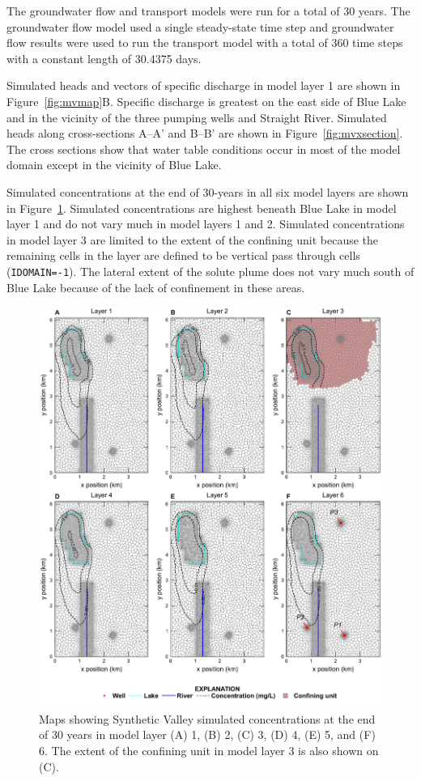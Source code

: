 \documentclass[12pt, oneside]{article}  	%
\begin{document}
The groundwater flow and transport models were run for a total of 30 years. The groundwater flow model used a single steady-state time step and groundwater flow results were used to run the transport model with a total of 360 time steps with a constant length of 30.4375 days.
 
Simulated heads and vectors of specific discharge in model layer 1 are shown in Figure~\ref{fig:mvmap}B. Specific discharge is greatest on the east side of Blue Lake and in the vicinity of the three pumping wells and Straight River. Simulated heads along cross-sections A--A' and B--B' are shown in Figure~\ref{fig:mvxsection}. The cross sections show that water table conditions occur in most of the model domain except in the vicinity of Blue Lake.

Simulated concentrations at the end of 30-years in all six model layers are shown in Figure~\ref{fig:mvconc}. Simulated concentrations are highest beneath Blue Lake in model layer 1 and do not vary much in model layers 1 and 2. Simulated concentrations in model layer 3 are limited to the extent of the confining unit because the remaining cells in the layer are defined to be vertical pass through cells (\texttt{IDOMAIN=-1}). The lateral extent of the solute plume does not vary much south of Blue Lake because of the lack of confinement in these areas.

\begin{figure}[ht!]
	\begin{center}
		\includegraphics{figures/mv_voronoi_map_concentration.pdf}
	\end{center}
	\caption{Maps showing Synthetic Valley simulated concentrations at the end of 30 years in model layer (A) 1, (B) 2, (C) 3, (D) 4, (E) 5, and (F) 6. The extent of the confining unit in model layer 3 is also shown on (C).}
	\label{fig:mvconc}
\end{figure}
\end{document}
